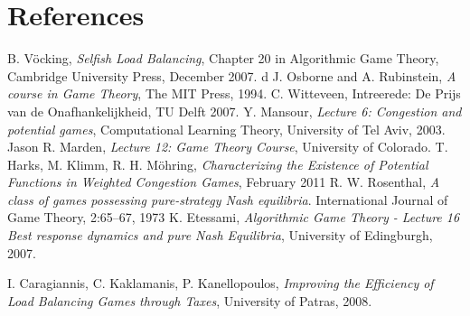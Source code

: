 \documentclass[a4paper,11pt]{article}
\begin{document}
\section{References}
\begin{thebibliography}{99}
 B. V\"{o}cking, \emph{Selfish Load Balancing}, Chapter 20 in Algorithmic Game Theory, Cambridge University Press, December 2007.
 d J. Osborne and A. Rubinstein, \emph{A course in Game Theory},  The MIT Press, 1994.
 C. Witteveen, Intreerede: De Prijs van de Onafhankelijkheid, TU Delft 2007.
 Y. Mansour, \emph{Lecture 6: Congestion and potential games}, Computational Learning Theory, University of Tel Aviv, 2003.
 Jason R. Marden, \emph{Lecture 12: Game Theory Course}, University of Colorado.
 T. Harks, M. Klimm, R. H. Möhring, \emph{Characterizing the Existence of Potential Functions in Weighted Congestion Games}, February 2011
 R. W. Rosenthal, \emph{ A class of games possessing pure-strategy Nash equilibria}. International Journal of Game Theory, 2:65–67, 1973
 K. Etessami, \emph{Algorithmic Game Theory - Lecture 16 Best response dynamics and pure Nash Equilibria}, University of Edingburgh, 2007.

 I. Caragiannis, C. Kaklamanis, P. Kanellopoulos, \emph{Improving the Efficiency of Load Balancing Games through Taxes}, University of Patras, 2008.
    \end{thebibliography}
\end{document}
